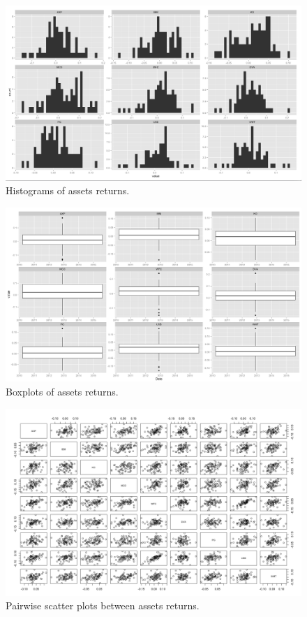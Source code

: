 \documentclass[10pt]{article_simple}
\begin{document}
\begin{figure}[H]
	\centering
  	\includegraphics[width=.85\linewidth]{histograms}
  	\centering
  	\caption{Histograms of assets returns.}
\end{figure}

\begin{figure}[H]
	\centering
  	\includegraphics[width=.85\linewidth]{boxplots}
  	\centering
  	\caption{Boxplots of assets returns.}
\end{figure}

\begin{figure}[H]
	\centering
  	\includegraphics[width=.85\linewidth]{pairwise_scatter_plots}
  	\centering
  	\caption{Pairwise scatter plots between assets returns.}
\end{figure}
\end{document}
